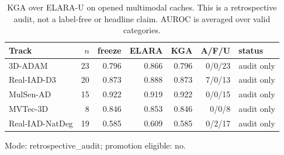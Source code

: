 \begin{table}[t]
\centering\footnotesize
\caption{KGA over ELARA-U on opened multimodal caches. This is a retrospective audit, not a label-free or headline claim. AUROC is averaged over valid categories.}
\label{tab:kga-elara-integrated}
\begin{tabular}{lrrrrrl}
\toprule
Track & $n$ & freeze & ELARA & KGA & A/F/U & status \\
\midrule
3D-ADAM & 23 & 0.796 & 0.866 & 0.796 & 0/0/23 & audit only \\
Real-IAD-D3 & 20 & 0.873 & 0.888 & 0.873 & 7/0/13 & audit only \\
MulSen-AD & 15 & 0.922 & 0.919 & 0.922 & 0/0/15 & audit only \\
MVTec-3D & 8 & 0.846 & 0.853 & 0.846 & 0/0/8 & audit only \\
Real-IAD-NatDeg & 19 & 0.585 & 0.609 & 0.585 & 0/2/17 & audit only \\
\bottomrule
\end{tabular}
\par\vspace{2pt}\scriptsize Mode: retrospective\_audit; promotion eligible: no.
\end{table}
